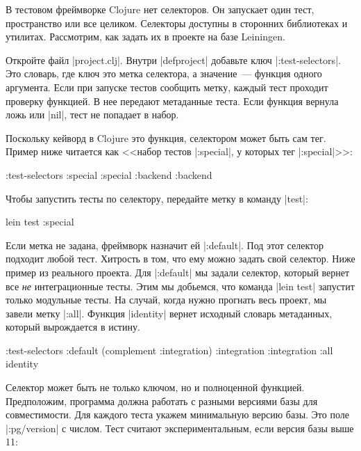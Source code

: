 В тестовом фреймворке Clojure нет селекторов. Он запускает один тест,
пространство или все целиком. Селекторы доступны в сторонних библиотеках и
утилитах. Рассмотрим, как задать их в проекте на базе Leiningen.

Откройте файл \spverb|project.clj|. Внутри \spverb|defproject| добавьте ключ
\spverb|:test-selectors|. Это словарь, где ключ это метка селектора, а
значение~--- функция одного аргумента. Если при запуске тестов сообщить метку,
каждый тест проходит проверку функцией. В нее передают метаданные теста. Если
функция вернула ложь или \spverb|nil|, тест не попадает в набор.

Поскольку кейворд в Clojure это функция, селектором может быть сам тег. Пример
ниже читается как <<набор тестов \spverb|:special|, у которых тег
\spverb|:special|>>:

\begin{english}
  \begin{clojure}
:test-selectors {:special :special
                 :backend :backend}
  \end{clojure}
\end{english}

Чтобы запустить тесты по селектору, передайте метку в команду \spverb|test|:

\begin{english}
  \begin{clojure}
lein test :special
  \end{clojure}
\end{english}

Если метка не задана, фреймворк назначит ей \spverb|:default|. Под этот селектор
подходит любой тест. Хитрость в том, что ему можно задать свой селектор. Ниже
пример из реального проекта. Для \spverb|:default| мы задали селектор, который
вернет все \emph{не} интеграционные тесты. Этим мы добьемся, что команда
\spverb|lein test| запустит только модульные тесты. На случай, когда нужно
прогнать весь проект, мы завели метку \spverb|:all|. Функция \spverb|identity|
вернет исходный словарь метаданных, который вырождается в истину.

\begin{english}
  \begin{clojure}
:test-selectors {:default (complement :integration)
                 :integration :integration
                 :all identity}
  \end{clojure}
\end{english}

Селектор может быть не только ключом, но и полноценной функцией. Предположим,
программа должна работать с разными версиями базы для совместимости. Для каждого
теста укажем минимальную версию базы. Это поле \spverb|:pg/version| с
числом. Тест считают экспериментальным, если версия базы выше 11:

